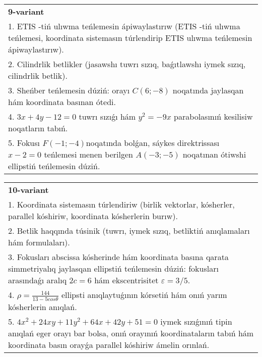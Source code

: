 \documentclass{article}
\begin{document}
\begin{tabular}{m{17cm}}
\textbf{9-variant}\\
1. ETIS -tiń ulıwma teńlemesin ápiwaylastırıw (ETIS -tiń ulıwma teńlemesi, koordinata sistemasın túrlendirip ETIS ulıwma teńlemesin ápiwaylastırıw).\\

2. Cilindrlik betlikler (jasawshı tuwrı sızıq, baǵıtlawshı iymek sızıq, cilindrlik betlik).\\

3. Sheńber teńlemesin dúziń: orayı $C (6 ;-8) $ noqatında jaylasqan hám koordinata basınan ótedi.\\

4. $3x + 4y - 12 = 0$ tuwrı sızıǵı hám $y^{2} = - 9x$ parabolasınıń kesilisiw noqatların tabıń.  \\

5. Fokusı $F( - 1; - 4)$noqatında bolǵan, sáykes direktrissası $x - 2 = 0$ teńlemesi menen berilgen $A( - 3; - 5)$ noqatınan ótiwshi ellipstiń teńlemesin dúziń.  
\end{tabular}
\vspace{1cm}


\begin{tabular}{m{17cm}}
\textbf{10-variant}\\
1. Koordinata sistemasın túrlendiriw (birlik vektorlar, kósherler, parallel kóshiriw, koordinata kósherlerin burıw).\\

2. Betlik haqqında túsinik (tuwrı, iymek sızıq, betliktiń anıqlamaları hám formulaları).\\

3. Fokusları abscissa kósherinde hám koordinata basına qarata simmetriyalıq jaylasqan ellipstiń teńlemesin dúziń: fokusları arasındaǵı aralıq $2 c=6$ hám ekscentrisitet $\varepsilon=3/5$.\\

4. $\rho = \frac{144}{13 - 5cos\theta}$ ellipsti anıqlaytuǵının kórsetiń hám onıń yarım kósherlerin anıqlań.\\

5. $4x^{2} + 24xy + 11y^{2} + 64x + 42y + 51 = 0$ iymek sızıǵınıń tipin anıqlań eger orayı bar bolsa, onıń orayınıń koordinataların tabıń hám koordinata basın orayǵa parallel kóshiriw ámelin orınlań.  
\end{tabular}
\vspace{1cm}
\end{document}
